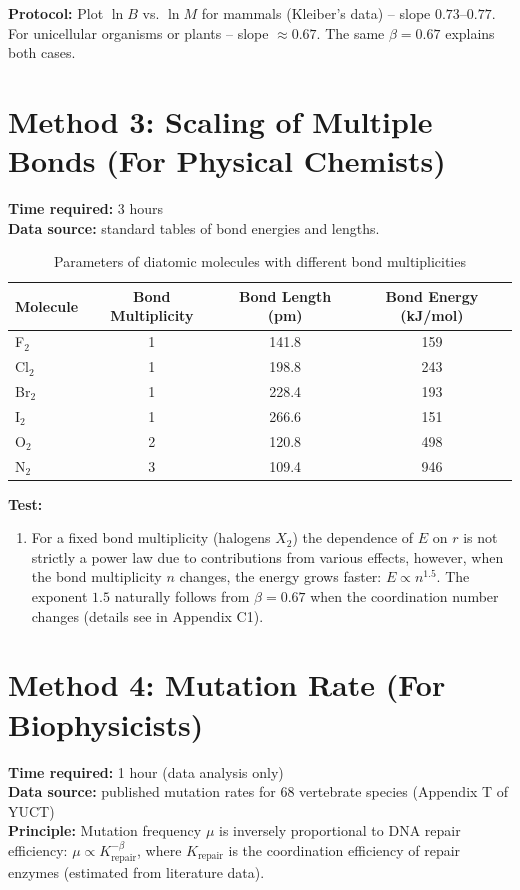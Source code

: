 \documentclass[12pt,a4paper]{article}
\begin{document}
	\textbf{Protocol:} Plot $\ln B$ vs. $\ln M$ for mammals (Kleiber's data) – slope $0.73$–$0.77$. For unicellular organisms or plants – slope $\approx 0.67$. The same $\beta = 0.67$ explains both cases.
	
	\section{Method 3: Scaling of Multiple Bonds (For Physical Chemists)}
	
	\textbf{Time required:} 3 hours \\
	\textbf{Data source:} standard tables of bond energies and lengths.
	
	\begin{table}[h]
		\centering
		\caption{Parameters of diatomic molecules with different bond multiplicities}
		\label{tab:multibond}
		\begin{tabular}{lccc}
			\toprule
			Molecule & Bond Multiplicity & Bond Length (pm) & Bond Energy (kJ/mol) \\
			\midrule
			F$_2$ & 1 & 141.8 & 159 \\
			Cl$_2$ & 1 & 198.8 & 243 \\
			Br$_2$ & 1 & 228.4 & 193 \\
			I$_2$ & 1 & 266.6 & 151 \\
			O$_2$ & 2 & 120.8 & 498 \\
			N$_2$ & 3 & 109.4 & 946 \\
			\bottomrule
		\end{tabular}
	\end{table}
	
	\textbf{Test:}
	\begin{enumerate}
		\item For a fixed bond multiplicity (halogens $X_2$) the dependence of $E$ on $r$ is not strictly a power law due to contributions from various effects, however, when the bond multiplicity $n$ changes, the energy grows faster: $E \propto n^{1.5}$. The exponent $1.5$ naturally follows from $\beta = 0.67$ when the coordination number changes (details see in Appendix C1).
	\end{enumerate}
	
	\section{Method 4: Mutation Rate (For Biophysicists)}
	
	\textbf{Time required:} 1 hour (data analysis only) \\
	\textbf{Data source:} published mutation rates for 68 vertebrate species (Appendix T of YUCT) \\
	\textbf{Principle:} Mutation frequency $\mu$ is inversely proportional to DNA repair efficiency: $\mu \propto K_{\text{repair}}^{-\beta}$, where $K_{\text{repair}}$ is the coordination efficiency of repair enzymes (estimated from literature data).
	
\end{document}
